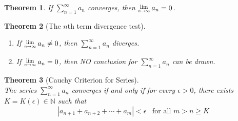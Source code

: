 \documentclass[12pt]{article}
\newcommand{\Lim}[1]{\raisebox{0.5ex}{\scalebox{0.8}{$\displaystyle \lim_{#1}\;$}}}
\newtheorem{theorem}{Theorem}[section]
\theoremstyle{definition}
\begin{document}
\begin{theorem}\normalfont If $\sum_{n=1}^\infty a_n$ converges, then $\Lim{n\to\infty} a_n=0$.
\end{theorem}
\begin{theorem}[The $n$th term divergence test]
\hfill\\\normalfont
\begin{enumerate}
\item If $\Lim{n\to\infty} a_n\neq 0$, then $\sum_{n=1}^\infty a_n$ diverges.
\item If $\Lim{n\to\infty} a_n= 0$, then NO conclusion for $\sum_{n=1}^\infty a_n$ can be drawn.
\end{enumerate}
\end{theorem}
\begin{theorem}[Cauchy Criterion for Series]
\hfill\\\normalfont
The series $\sum_{n=1}^\infty a_n$ converges if and only if for every $\epsilon>0$, there exists $K=K(\epsilon)\in\mathbb{N}$ such that
\[
|a_{n+1}+a_{n+2}+\cdots+a_m|<\epsilon\;\;\;\text{for all }m>n\geq K
\]
\end{theorem}
\end{document}
